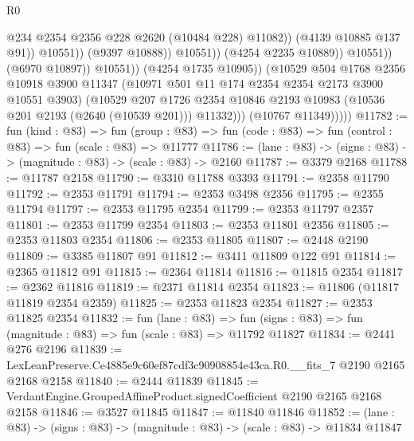 \begin{lexlean}{R0}
\begin{coremodule}
                                            @234
                                            @2354
                                            @2356
                                            @228
                                            @2620
                                            (@10484 @228)
                                            @11082))
                                        (@4139 @10885 @137 @91))
                                      @10551))
                                  (@9397 @10888))
                                @10551))
                            (@4254 @2235 @10889))
                          @10551))
                      (@6970 @10897))
                    @10551))
                (@4254 @1735 @10905))
              (@10529
                @504
                @1768
                @2356
                @10918
                @3900
                @11347
                (@10971 @501 @11 @174 @2354 @2354 @2173 @3900 @10551 @3903)
                (@10529
                  @207
                  @1726
                  @2354
                  @10846
                  @2193
                  @10983
                  (@10536 @201 @2193 (@2640 (@10539 @201)))
                  @11332)))
            (@10767 @11349)))))
@11782 := fun (kind : @83) =>
  fun (group : @83) => fun (code : @83) => fun (control : @83) => fun (scale : @83) => @11777
@11786 := (lane : @83) -> (signs : @83) -> (magnitude : @83) -> (scale : @83) -> @2160
@11787 := @3379 @2168
@11788 := @11787 @2158
@11790 := @3310 @11788 @3393
@11791 := @2358 @11790
@11792 := @2353 @11791
@11794 := @2353 @3498 @2356
@11795 := @2355 @11794
@11797 := @2353 @11795 @2354
@11799 := @2353 @11797 @2357
@11801 := @2353 @11799 @2354
@11803 := @2353 @11801 @2356
@11805 := @2353 @11803 @2354
@11806 := @2353 @11805
@11807 := @2448 @2190
@11809 := @3385 @11807 @91
@11812 := @3411 @11809 @122 @91
@11814 := @2365 @11812 @91
@11815 := @2364 @11814
@11816 := @11815 @2354
@11817 := @2362 @11816
@11819 := @2371 @11814 @2354
@11823 := @11806 (@11817 @11819 @2354 @2359)
@11825 := @2353 @11823 @2354
@11827 := @2353 @11825 @2354
@11832 := fun (lane : @83) =>
  fun (signs : @83) => fun (magnitude : @83) => fun (scale : @83) => @11792 @11827
@11834 := @2441 @276 @2196
@11839 := LexLeanPreserve.Ce4885e9c60ef87cdf3c90908854e43ca.R0.__fits_7 @2190 @2165 @2168 @2158
@11840 := @2444 @11839
@11845 := VerdantEngine.GroupedAffineProduct.signedCoefficient @2190 @2165 @2168 @2158
@11846 := @3527 @11845
@11847 := @11840 @11846
@11852 := (lane : @83) -> (signs : @83) -> (magnitude : @83) -> (scale : @83) -> @11834 @11847

\end{coremodule}
\end{lexlean}
